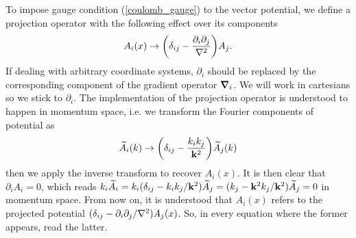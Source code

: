 To impose gauge condition (\ref{coulomb_gauge}) to the vector potential, we define a projection operator with the following effect over its components
\begin{equation}
    A_i(x)\to\qty(\delta_{ij}-\frac{\partial_i\partial_j}{\laplacian})A_j.
    \label{projection_op}
\end{equation}
If dealing with arbitrary coordinate systems, $\partial_i$ should be replaced by the corresponding component of the gradient operator $\grad_i$. We will work in cartesians so we stick to $\partial_i$. The implementation of the projection operator is understood to happen in momentum space, i.e. we transform the Fourier components of potential as
\begin{equation}
    \widetilde{A}_i(k)\to\qty(\delta_{ij}-\frac{k_ik_j}{\vb{k}^2})\widetilde{A}_j(k)
\end{equation}
then we apply the inverse transform to recover $A_i(x)$. It is then clear that $\partial_iA_i=0$, which reads $k_i\widetilde{A}_i=k_i(\delta_{ij}-k_ik_j/\vb{k}^2)\widetilde{A}_j=(k_j-\vb{k}^2k_j/\vb{k}^2)\widetilde{A}_j=0$ in momentum space. From now on, it is understood that $A_i(x)$ refers to the projected potential $(\delta_{ij}-\partial_i\partial_j/\laplacian)A_j(x)$. So, in every equation where the former appears, read the latter.

